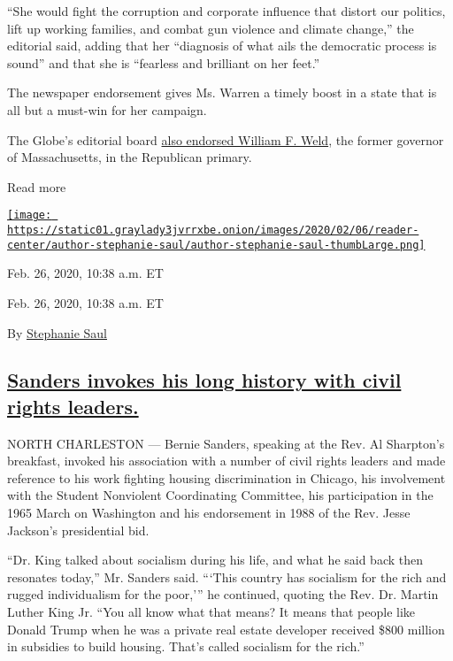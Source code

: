 ``She would fight the corruption and corporate influence that distort
our politics, lift up working families, and combat gun violence and
climate change,'' the editorial said, adding that her ``diagnosis of
what ails the democratic process is sound'' and that she is ``fearless
and brilliant on her feet.''

The newspaper endorsement gives Ms. Warren a timely boost in a state
that is all but a must-win for her campaign.

The Globe's editorial board
\href{https://www.bostonglobe.com/2020/02/26/opinion/gop-primaries-nominating-bill-weld-would-restore-principle-probity-republican-party/}{also
endorsed William F. Weld}, the former governor of Massachusetts, in the
Republican primary.

Read more

\href{https://www.nytimes3xbfgragh.onion/by/stephanie-saul}{\texttt{[image: https://static01.graylady3jvrrxbe.onion/images/2020/02/06/reader-center/author-stephanie-saul/author-stephanie-saul-thumbLarge.png]}}

Feb. 26, 2020, 10:38 a.m. ET

Feb. 26, 2020, 10:38 a.m. ET

By \href{https://www.nytimes3xbfgragh.onion/by/stephanie-saul}{Stephanie
Saul}

\hypertarget{sanders-invokes-his-long-history-with-civil-rights-leaders}{%
\subsection{\texorpdfstring{\protect\hyperlink{sanders-invokes-his-long-history-with-civil-rights-leaders}{Sanders
invokes his long history with civil rights
leaders.}}{Sanders invokes his long history with civil rights leaders.}}\label{sanders-invokes-his-long-history-with-civil-rights-leaders}}

NORTH CHARLESTON --- Bernie Sanders, speaking at the Rev. Al Sharpton's
breakfast, invoked his association with a number of civil rights leaders
and made reference to his work fighting housing discrimination in
Chicago, his involvement with the Student Nonviolent Coordinating
Committee, his participation in the 1965 March on Washington and his
endorsement in 1988 of the Rev. Jesse Jackson's presidential bid.

``Dr. King talked about socialism during his life, and what he said back
then resonates today,'' Mr. Sanders said. ```This country has socialism
for the rich and rugged individualism for the poor,''' he continued,
quoting the Rev. Dr. Martin Luther King Jr. ``You all know what that
means? It means that people like Donald Trump when he was a private real
estate developer received \$800 million in subsidies to build housing.
That's called socialism for the rich.''

